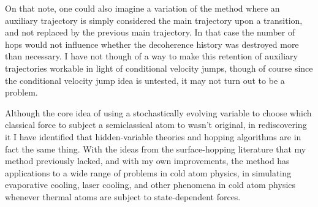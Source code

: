 On that note, one could also imagine a variation of the method where an auxiliary trajectory is simply considered the main trajectory upon a transition, and not replaced by the previous main trajectory. In that case the number of hops would not influence whether the decoherence history was destroyed more than necessary. I have not though of a way to make this retention of auxiliary trajectories workable in light of conditional velocity jumps, though of course since the conditional velocity jump idea is untested, it may not turn out to be a problem.

Although the core idea of using a stochastically evolving variable to choose which classical force to subject a semiclassical atom to wasn't original, in rediscovering it I have identified that hidden-variable theories and hopping algorithms are in fact the same thing. With the ideas from the surface-hopping literature that my method previously lacked, and with my own improvements, the method has applications to a wide range of problems in cold atom physics, in simulating evaporative cooling, laser cooling, and other phenomena in cold atom physics whenever thermal atoms are subject to state-dependent forces. 